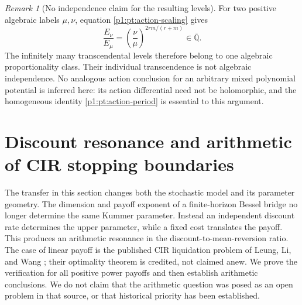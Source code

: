 \documentclass[11pt,a4paper]{article}
\theoremstyle{definition}
\theoremstyle{remark}
\newtheorem{remark}[theorem]{Remark}
\numberwithin{equation}{section}
\begin{document}
\begin{remark}[No independence claim for the resulting levels]
For two positive algebraic labels $\mu,\nu$, equation
\eqref{p1:pt:action-scaling} gives
\[
 \frac{E_\nu}{E_\mu}
 =\left(\frac{\nu}{\mu}\right)^{2rm/(r+m)}
 \in\overline{\mathbb Q}.
\]
The infinitely many transcendental levels therefore belong to one
algebraic proportionality class.  Their individual transcendence is
not algebraic independence.  No analogous action conclusion for an
arbitrary mixed polynomial potential is inferred here: its action
differential need not be holomorphic, and the homogeneous identity
\eqref{p1:pt:action-period} is essential to this argument.
\end{remark}


\section{Discount resonance and arithmetic of CIR stopping boundaries}
\label{p1:stp:section}

The transfer in this section changes both the stochastic model and its
parameter geometry.  The dimension and payoff exponent of a finite-horizon
Bessel bridge no longer determine the same Kummer parameter.  Instead an
independent discount rate determines the upper parameter, while a fixed
cost translates the payoff.  This produces an arithmetic resonance in the
discount-to-mean-reversion ratio.  The case of linear payoff is the
published CIR liquidation problem of Leung, Li, and Wang
\cite[Theorem~3.1]{p1:LLW2018}; their optimality theorem is credited, not
claimed anew.  We prove the verification for all positive power payoffs
and then establish arithmetic conclusions.  We do not claim that the
arithmetic question was posed as an open problem in that source, or that
historical priority has been established.
\end{document}
